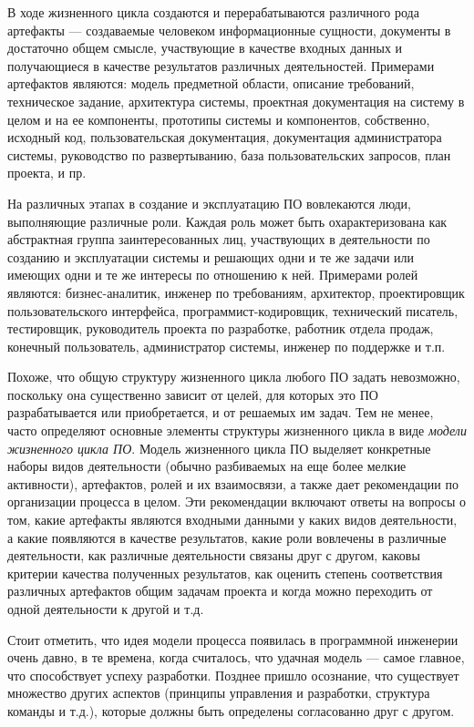 \documentclass{../../text-style}
\begin{document}
В ходе жизненного цикла создаются и перерабатываются различного рода артефакты --- создаваемые человеком информационные сущности, документы в достаточно общем смысле, участвующие в качестве входных данных и получающиеся в качестве результатов различных деятельностей. Примерами артефактов являются: модель предметной области, описание требований, техническое задание, архитектура системы, проектная документация на систему в целом и на ее компоненты, прототипы системы и компонентов, собственно, исходный код, пользовательская документация, документация администратора системы, руководство по развертыванию, база пользовательских запросов, план проекта, и пр.

На различных этапах в создание и эксплуатацию ПО вовлекаются люди, выполняющие различные роли. Каждая роль может быть охарактеризована как абстрактная группа заинтересованных лиц, участвующих в деятельности по созданию и эксплуатации системы и решающих одни и те же задачи или имеющих одни и те же интересы по отношению к ней. Примерами ролей являются: бизнес-аналитик, инженер по требованиям, архитектор, проектировщик пользовательского интерфейса, программист-кодировщик, технический писатель, тестировщик, руководитель проекта по разработке, работник отдела продаж, конечный пользователь, администратор системы, инженер по поддержке и т.п.

Похоже, что общую структуру жизненного цикла любого ПО задать невозможно, поскольку она существенно зависит от целей, для которых это ПО разрабатывается или приобретается, и от решаемых им задач. Тем не менее, часто определяют основные элементы структуры жизненного цикла в виде \emph{модели жизненного цикла ПО}. Модель жизненного цикла ПО выделяет конкретные наборы видов деятельности (обычно разбиваемых на еще более мелкие активности), артефактов, ролей и их взаимосвязи, а также дает рекомендации по организации процесса в целом. Эти рекомендации включают ответы на вопросы о том, какие артефакты являются входными данными у каких видов деятельности, а какие появляются в качестве результатов, какие роли вовлечены в различные деятельности, как различные деятельности связаны друг с другом, каковы критерии качества полученных результатов, как оценить степень соответствия различных артефактов общим задачам проекта и когда можно переходить от одной деятельности к другой и т.д.

Стоит отметить, что идея модели процесса появилась в программной инженерии очень давно, в те времена, когда считалось, что удачная модель --- самое главное, что способствует успеху разработки. Позднее пришло осознание, что существует множество других аспектов (принципы управления и разработки, структура команды и т.д.), которые должны быть определены согласованно друг с другом.
\end{document}
